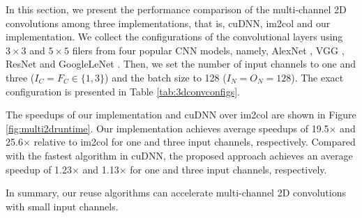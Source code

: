 In this section, we present the performance comparison of the multi-channel 2D convolutions among three implementations, that is, cuDNN, im2col and our implementation. We collect the configurations of the convolutional layers using $3 \times 3$ and $5 \times 5$ filers from four popular CNN models,
namely, AlexNet \cite{Krizhevsky2012ImageNet}, VGG \cite{SimonyanZ14a}, ResNet \cite{HeZRS16} and GoogleLeNet \cite{SzegedyLJSRAEVR15}.
Then, we set the number of input channels to one and three ($I_C=F_C \in \{1, 3\}$) and the batch size to 128 ($I_N=O_N=128$). The exact configuration is presented in Table \ref{tab:3dconvconfigs}.

The speedups of our implementation and cuDNN over im2col are shown
in Figure \ref{fig:multi2druntime}. Our
implementation achieves average speedups of 19.5$\times$ and 25.6$\times$ relative to im2col for one and three input channels, respectively. Compared with the fastest algorithm in cuDNN, the proposed approach achieves an average speedup of 1.23$\times$ and 1.13$\times$ for one and three input channels, respectively.

In summary, our reuse algorithms can accelerate multi-channel 2D convolutions with small input channels.



